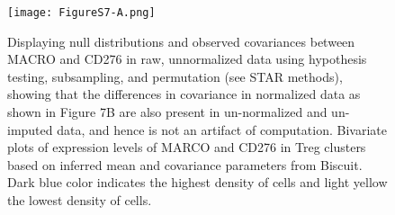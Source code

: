 \begin{figure}
\centering
\texttt{[image: FigureS7-A.png]}
\caption{Displaying null distributions and observed covariances between MACRO and CD276 in raw, unnormalized data using hypothesis testing, subsampling, and permutation (see STAR methods), showing that the differences in covariance in normalized data as shown in  Figure 7B are also present in un-normalized and un-imputed data, and hence is not an artifact of computation.
Bivariate plots of expression levels of MARCO and CD276 in Treg clusters based on inferred mean and covariance parameters from Biscuit. Dark blue color indicates the highest density of cells and light yellow the lowest density of cells.
}
\label{fig:s7a}
\end{figure}

